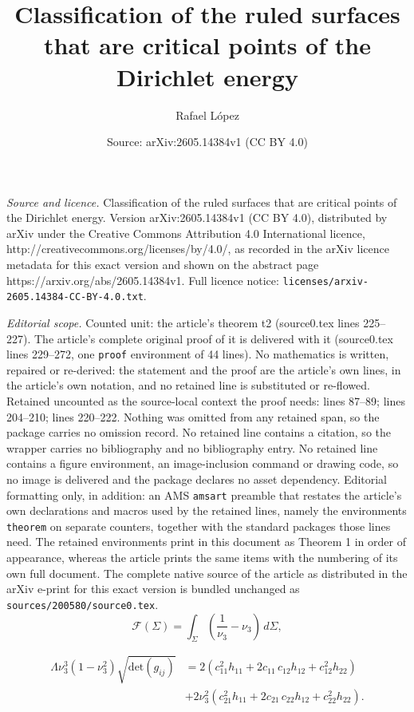 \documentclass[10pt,a4paper]{amsart}
\title{Classification of the ruled surfaces that are critical points of the Dirichlet energy}
\author{Rafael L\'opez}
\date{Source: arXiv:2605.14384v1 (CC BY 4.0)}
\begin{document}
\maketitle

\noindent\emph{Source and licence.} Classification of the ruled surfaces that are critical points of the Dirichlet energy. Version arXiv:2605.14384v1 (CC BY 4.0), distributed by arXiv under the Creative Commons Attribution 4.0 International licence, http://creativecommons.org/licenses/by/4.0/, as recorded in the arXiv licence metadata for this exact version and shown on the abstract page https://arxiv.org/abs/2605.14384v1. Full licence notice: \texttt{licenses/arxiv-2605.14384-CC-BY-4.0.txt}.\par\smallskip

\noindent\textit{Editorial scope.} Counted unit: the article's theorem t2 (source0.tex lines 225--227). The article's complete original proof of it is delivered with it (source0.tex lines 229--272, one \texttt{proof} environment of 44 lines). No mathematics is written, repaired or re-derived: the statement and the proof are the article's own lines, in the article's own notation, and no retained line is substituted or re-flowed.  Retained uncounted as the source-local context the proof needs: lines 87--89; lines 204--210; lines 220--222.  Nothing was omitted from any retained span, so the package carries no omission record.  No retained line contains a citation, so the wrapper carries no bibliography and no bibliography entry.  No retained line contains a figure environment, an image-inclusion command or drawing code, so no image is delivered and the package declares no asset dependency.  Editorial formatting only, in addition: an AMS \texttt{amsart} preamble that restates the article's own declarations and macros used by the retained lines, namely the environments \texttt{theorem} on separate counters, together with the standard packages those lines need.  The retained environments print in this document as Theorem 1 in order of appearance, whereas the article prints the same items with the numbering of its own full document.  The complete native source of the article as distributed in the arXiv e-print for this exact version is bundled unchanged as \texttt{sources/200580/source0.tex}.
\begin{equation}\label{fu}
\mathcal{F}(\Sigma)=\int_\Sigma \left(\dfrac{1}{\nu_3}-\nu_3\right)\, d\Sigma,
\end{equation}

\begin{equation}\label{h3}
\begin{split}
\Lambda\nu_3^3(1-\nu_3^2) \sqrt{\mbox{det}(g_{ij})}&=
2 (c_{11}^2h_{11}+2c_{11}\,c_{12}h_{12} +c_{12}^2h_{22})\\
&+2\nu_3^2 ( c_{21}^2h_{11}+2c_{21}\,c_{22}h_{12} +c_{22}^2h_{22}).
\end{split}
\end{equation}
\end{document}

